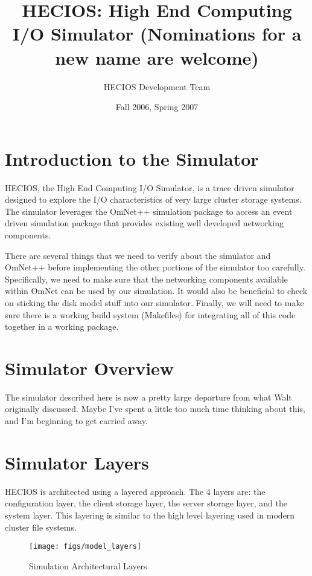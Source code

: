 \documentclass[11pt]{article}
\title{HECIOS: High End Computing I/O Simulator 
       (Nominations for a new name are welcome)}
\author{HECIOS Development Team}
\date{Fall 2006, Spring 2007}
\begin{document}
\maketitle
\newpage


%
%
\setlength{\parindent}{0pt}
\setlength{\parskip}{11pt}

%
%
\section{Introduction to the Simulator}
HECIOS, the High End Computing I/O Simulator, is a trace driven simulator
designed to explore the I/O characteristics of very large cluster storage
systems.  The simulator leverages the OmNet++ simulation package to access an
event driven simulation package that provides existing well developed
networking components.

There are several things that we need to verify about the simulator and
OmNet++ before implementing the other portions of the simulator too
carefully.  Specifically, we need to make sure that the networking components
available within OmNet can be used by our simulation.  It would also be
beneficial to check on sticking the disk model stuff into our simulator.
Finally, we will need to make sure there is a working build system (Makefiles)
for integrating all of this code together in a working package.

\section{Simulator Overview}
The simulator described here is now a pretty large departure from what Walt
originally discussed.  Maybe I've spent a little too much time thinking about
this, and I'm beginning to get carried away.

\section{Simulator Layers}
HECIOS is architected using a layered approach.  The 4 layers are: the
configuration layer, the client storage layer, the server storage layer, and
the system layer.  This layering is similar to the high level layering used in
modern cluster file systems.
 
\begin{figure}[t]
  \begin{center}
    \texttt{[image: figs/model\_layers]}
  \end{center}
  \caption{Simulation Architectural Layers \label{fig:model-layers}}
\end{figure}
\end{document}
